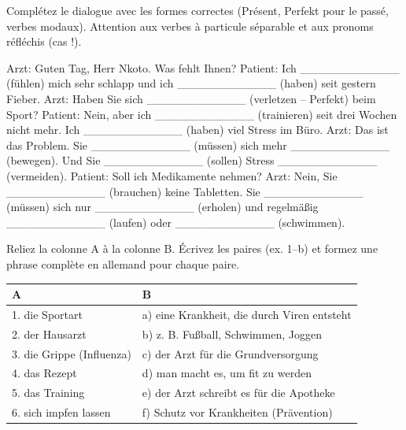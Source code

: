 \documentclass[11pt]{article}
\begin{document}
\begin{exercice}
Complétez le dialogue avec les formes correctes (Présent, Perfekt pour le passé, verbes modaux). Attention aux verbes à particule séparable et aux pronoms réfléchis (cas !).
\begin{textebox}
Arzt: Guten Tag, Herr Nkoto. Was fehlt Ihnen?
Patient: Ich \_\_\_\_\_\_\_\_\_\_\_\_ (fühlen) mich sehr schlapp und ich \_\_\_\_\_\_\_\_\_\_\_\_ (haben) seit gestern Fieber.
Arzt: Haben Sie sich \_\_\_\_\_\_\_\_\_\_\_\_ (verletzen -- Perfekt) beim Sport?
Patient: Nein, aber ich \_\_\_\_\_\_\_\_\_\_\_\_ (trainieren) seit drei Wochen nicht mehr. Ich \_\_\_\_\_\_\_\_\_\_\_\_ (haben) viel Stress im Büro.
Arzt: Das ist das Problem. Sie \_\_\_\_\_\_\_\_\_\_\_\_ (müssen) sich mehr \_\_\_\_\_\_\_\_\_\_\_\_ (bewegen). Und Sie \_\_\_\_\_\_\_\_\_\_\_\_ (sollen) Stress \_\_\_\_\_\_\_\_\_\_\_\_ (vermeiden).
Patient: Soll ich Medikamente nehmen?
Arzt: Nein, Sie \_\_\_\_\_\_\_\_\_\_\_\_ (brauchen) keine Tabletten. Sie \_\_\_\_\_\_\_\_\_\_\_\_ (müssen) sich nur \_\_\_\_\_\_\_\_\_\_\_\_ (erholen) und regelmäßig \_\_\_\_\_\_\_\_\_\_\_\_ (laufen) oder \_\_\_\_\_\_\_\_\_\_\_\_ (schwimmen).
\end{textebox}
\end{exercice}

\begin{exercice}
Reliez la colonne A à la colonne B. Écrivez les paires (ex. 1--b) et formez une phrase complète en allemand pour chaque paire.
\begin{center}
\begin{tabularx}{\linewidth}{|X|X|}
\hline
\rowcolor{poporangeL} \textbf{A} & \textbf{B} \\ \hline
1. die Sportart & a) eine Krankheit, die durch Viren entsteht \\ \hline
2. der Hausarzt & b) z. B. Fußball, Schwimmen, Joggen \\ \hline
3. die Grippe (Influenza) & c) der Arzt für die Grundversorgung \\ \hline
4. das Rezept & d) man macht es, um fit zu werden \\ \hline
5. das Training & e) der Arzt schreibt es für die Apotheke \\ \hline
6. sich impfen lassen & f) Schutz vor Krankheiten (Prävention) \\ \hline
\end{tabularx}
\end{center}
\end{exercice}
\end{document}
